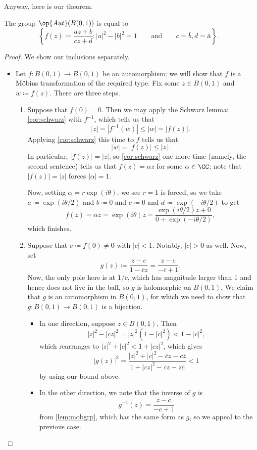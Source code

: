 \documentclass[../notes.tex]{subfiles}
\begin{document}
Anyway, here is our theorem.
\begin{theorem}
	The group $\op{Aut}(B(0,1))$ is equal to
	\[\left\{f(z)\coloneqq\frac{az+b}{cz+d}:|a|^2-|b|^2=1\qquad\text{and}\qquad c=\overline b,d=\overline a\right\}.\]
\end{theorem}
\begin{proof}
	We show our inclusions separately.
	\begin{itemize}
		\item Let $f\colon B(0,1)\to B(0,1)$ be an automorphism; we will show that $f$ is a M\"obius transformation of the required type. Fix some $z\in B(0,1)$ and $w\coloneqq f(z)$. There are three steps.
		\begin{enumerate}
			\item Suppose that $f(0)=0$. Then we may apply the Schwarz lemma: \autoref{cor:schwarz} with $f^{-1}$, which tells us that
			\[|z|=\left|f^{-1}(w)\right|\le|w|=|f(z)|.\]
			Applying \autoref{cor:schwarz} this time to $f$ tells us that
			\[|w|=|f(z)|\le|z|.\]
			In particular, $|f(z)|=|z|$, so \autoref{cor:schwarz} one more time (namely, the second sentence) tells us that $f(z)=\alpha z$ for some $\alpha\in\CC$; note that $|f(z)|=|z|$ forces $|\alpha|=1$.

			Now, setting $\alpha=r\exp(i\theta)$, we see $r=1$ is forced, so we take $a\coloneqq\exp(i\theta/2)$ and $b\coloneqq0$ and $c\coloneqq0$ and $d\coloneqq\exp(-i\theta/2)$ to get
			\[f(z)=\alpha z=\exp(i\theta)z=\frac{\exp(i\theta/2)z+0}{0+\exp(-i\theta/2)},\]
			which finishes.

			\item Suppose that $c\coloneqq f(0)\ne0$ with $|c|<1$. Notably, $|c|>0$ as well. Now, set
			\[g(z)\coloneqq\frac{z-c}{1-\overline cz}=\frac{z-c}{-\overline c+1}.\]
			Now, the only pole here is at $1/\overline c$, which has magnitude larger than $1$ and hence does not live in the ball, so $g$ is holomorphic on $B(0,1)$. We claim that $g$ is an automorphism in $B(0,1)$, for which we need to show that $g\colon B(0,1)\to B(0,1)$ is a bijection.
			\begin{itemize}
				\item In one direction, suppose $z\in B(0,1)$. Then
				\[|z|^2-|cz|^2=|z|^2\left(1-|c|^2\right)<1-|c|^2,\]
				which rearranges to $|z|^2+|c|^2<1+|cz|^2$, which gives
				\[|g(z)|^2=\frac{|z|^2+|c|^2-\overline cz-c\overline z}{1+|cz|^2-\overline cz-z\overline c}<1\]
				by using our bound above.
				\item In the other direction, we note that the inverse of $g$ is
				\[g^{-1}(z)=\frac{z-\overline c}{-c+1}\]
				from \autoref{lem:mobgrp}, which has the same form as $g$, so we appeal to the previous case.
			\end{itemize}


\end{enumerate}
\end{itemize}
\end{proof}
\end{document}
